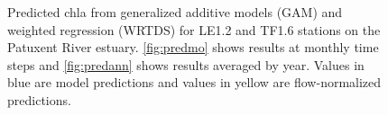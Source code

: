 \documentclass{svjour3}\usepackage[]{graphicx}\usepackage[]{color}
\begin{document}
\begin{figure}
\centering
{}


\caption{Predicted \ac{chla} from generalized additive models (GAM) and weighted regression (WRTDS) for LE1.2 and TF1.6 stations on the Patuxent River estuary.  \cref{fig:predmo} shows results at monthly time steps and \cref{fig:predann} shows results averaged by year.  Values in blue are model predictions and values in yellow are flow-normalized predictions.}
\label{fig:pred}
\end{figure}
\end{document}
